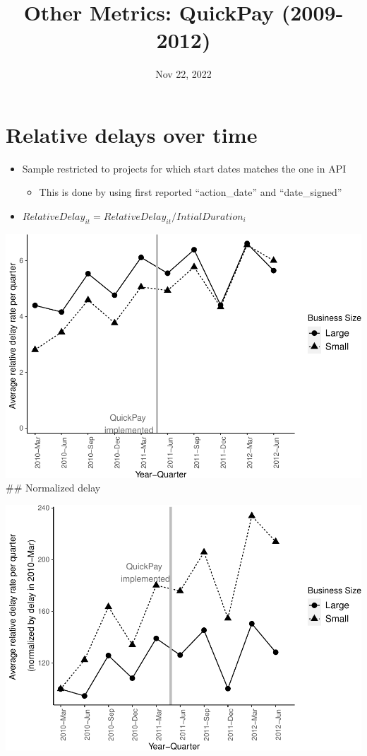 \documentclass[
]{article}
\title{Other Metrics: QuickPay (2009-2012)}
\author{}
\date{\vspace{-2.5em}Nov 22, 2022}
\providecommand{\tightlist}{%
  \setlength{\itemsep}{0pt}\setlength{\parskip}{0pt}}
\begin{document}
\maketitle

\hypertarget{relative-delays-over-time}{%
\section{Relative delays over time}\label{relative-delays-over-time}}

\begin{itemize}
\tightlist
\item
  Sample restricted to projects for which start dates matches the one in
  API

  \begin{itemize}
  \tightlist
  \item
    This is done by using first reported ``action\_date'' and
    ``date\_signed''
  \end{itemize}
\item
  \(RelativeDelay_{it} = RelativeDelay_{it}/IntialDuration_i\)
\end{itemize}

\includegraphics{qp_first_relative_delay_files/figure-latex/plot_relative_delay-1.pdf}
\#\# Normalized delay

\includegraphics{qp_first_relative_delay_files/figure-latex/normalized_plot-1.pdf}
\end{document}
